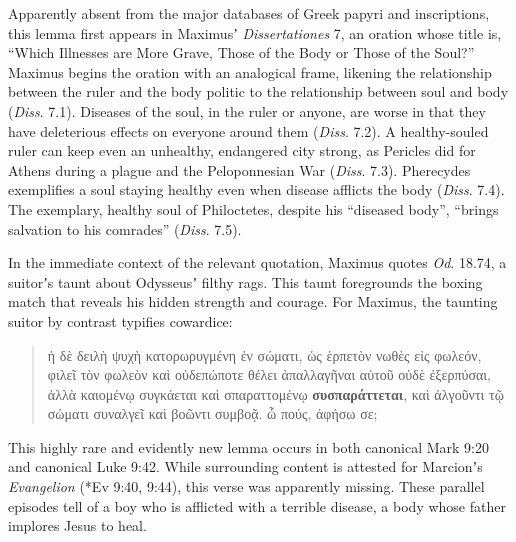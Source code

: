 Apparently absent from the major databases of Greek papyri and inscriptions, %
this lemma first appears in Maximusʼ \textit{Dissertationes} 7, %
an oration whose title is, “Which Illnesses are More Grave, %
Those of the Body or Those of the Soul?” %
Maximus begins the oration with an analogical frame, %
likening the relationship between the ruler and the body politic to the relationship %
between soul and body (\textit{Diss}. 7.1).  %
Diseases of the soul, in the ruler or anyone, are worse in that they have deleterious %
effects on everyone around them (\textit{Diss}. 7.2). %
A healthy-souled ruler can keep even an unhealthy, endangered city strong, %
as Pericles did for Athens during a plague and the Peloponnesian War (\textit{Diss}. 7.3). %
Pherecydes exemplifies a soul staying healthy even when disease afflicts the body (\textit{Diss}. 7.4). %
The exemplary, healthy soul of Philoctetes, despite his “diseased body”, %
“brings salvation to his comrades” (\textit{Diss}. 7.5). %

In the immediate context of the relevant quotation, %
Maximus quotes \textit{Od}. 18.74, a suitorʼs taunt about %
Odysseusʼ filthy rags. This taunt foregrounds %
the boxing match that reveals his hidden strength and courage. %
For Maximus, the taunting suitor by contrast typifies cowardice: %

\vfill{}
 \begin{quote}ἡ δὲ δειλὴ ψυχὴ κατορωρυγμένη ἐν σώματι, %
 ὡς ἑρπετὸν νωθὲς εἰς φωλεόν, %
 φιλεῖ τὸν φωλεὸν καὶ οὐδεπώποτε θέλει %
 ἀπαλλαγῆναι αὐτοῦ οὐδὲ ἐξερπύσαι, %
 ἀλλὰ καιομένῳ συγκάεται καὶ σπαραττομένῳ \textbf{συσπαράττεται}, %
 καὶ ἀλγοῦντι τῷ σώματι συναλγεῖ καὶ βοῶντι συμβοᾷ. %
 ὦ πούς, ἀφήσω σε; \\[1mm] %
  \end{quote} %
 \vfill{}
 \clearpage

This highly rare and evidently new lemma occurs in both canonical Mark 9:20 and canonical Luke 9:42. %
While surrounding content is attested for Marcionʼs \textit{Evangelion} (*Ev 9:40, 9:44), %
this verse was apparently missing. %
These parallel episodes tell of a boy who is afflicted with a terrible disease, %
a body whose father implores Jesus to heal. %

